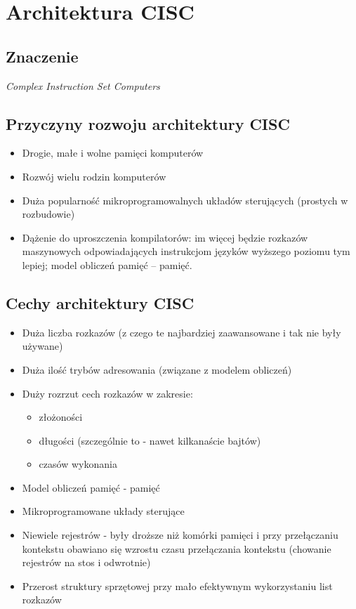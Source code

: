\section{Architektura CISC}
	\subsection{Znaczenie} \noindent
		\emph{Complex Instruction Set Computers}
	
	\subsection{Przyczyny rozwoju architektury CISC}
    	\begin{itemize}
	        \item Drogie, małe i wolne pamięci komputerów
	        \item Rozwój wielu rodzin komputerów
	        \item Duża popularność mikroprogramowalnych układów sterujących (prostych w rozbudowie)
	        \item Dążenie do uproszczenia kompilatorów: im więcej będzie rozkazów maszynowych odpowiadających instrukcjom języków wyższego poziomu tym lepiej; model obliczeń pamięć – pamięć.
        \end{itemize}
    
    \subsection{Cechy architektury CISC}
    	\begin{itemize}
	        \item Duża liczba rozkazów (z czego te najbardziej zaawansowane i tak nie były używane)
	        \item Duża ilość trybów adresowania (związane z modelem obliczeń)
	        \item Duży rozrzut cech rozkazów w zakresie:
	        \begin{itemize}
		        \item złożoności
		        \item długości (szczególnie to - nawet kilkanaście bajtów)
		        \item czasów wykonania
	        \end{itemize}
	        \item Model obliczeń pamięć - pamięć
	        \item Mikroprogramowane układy sterujące
	        \item Niewiele rejestrów - były droższe niż komórki pamięci i przy przełączaniu kontekstu obawiano się wzrostu czasu przełączania kontekstu (chowanie rejestrów na stos i odwrotnie)
	        \item Przerost struktury sprzętowej przy mało efektywnym wykorzystaniu list rozkazów
        \end{itemize}
   
